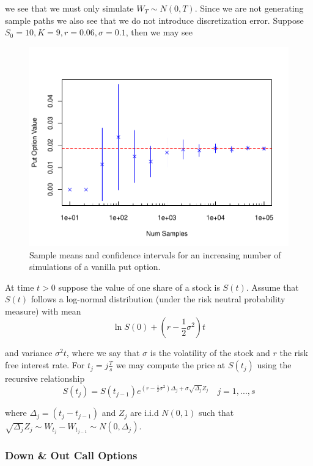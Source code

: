 \documentclass[12pt]{article}
\newlength\tindent
\renewcommand{\indent}{\hspace*{\tindent}}
\begin{document}
we see that we must only simulate $W_T \sim N(0, T)$. Since we are not generating sample paths we also see that we do not introduce discretization error. Suppose $S_0 = 10, K = 9, r = 0.06, \sigma = 0.1$, then we may see

\begin{figure}[H]
	\centering
 	\includegraphics{./plots/putapprox.pdf}
\caption{Sample means and confidence intervals for an increasing number of simulations of a vanilla put option.}
\end{figure}

\indent At time $t > 0$ suppose the value of one share of a stock is $S(t)$. Assume that $S(t)$ follows a log-normal distribution (under the risk neutral probability measure) with mean
\begin{equation*}
	\ln S(0) + (r - \frac{1}{2}\sigma^2) t
\end{equation*}

and variance $\sigma^2 t$, where we say that $\sigma$ is the volatility of the stock and $r$ the risk free interest rate. For $t_j = j\frac{T}{s}$ we may compute the price at $S(t_j)$ using the recursive relationship
\begin{equation*}
	S(t_j) = S(t_{j-1})e^{(r - \frac{1}{2}\sigma^2)\Delta_j + \sigma \sqrt{\Delta_j}Z_j} \quad j = 1,...,s
\end{equation*}

where $\Delta_j = (t_j - t_{j-1})$ and $Z_j$ are i.i.d $N(0,1)$ such that $\sqrt{\Delta_j}Z_j \sim W_{t_j} - W_{t_{j-1}} \sim N(0, \Delta_j)$.

\subsubsection{Down \& Out Call Options}
\end{document}
